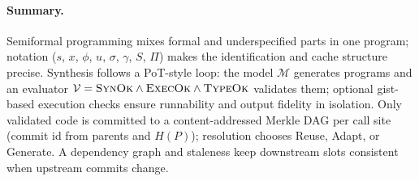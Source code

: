 
\paragraph{Summary.}
Semiformal programming mixes formal and underspecified parts in one program;
notation ($s$, $x$, $\phi$, $u$, $\sigma$, $\gamma$, $S$, $\Pi$) makes the
identification and cache structure precise.  Synthesis follows a PoT-style
loop: the model $\mathcal{M}$ generates programs and an evaluator
$\mathcal{V} = \textsc{SynOk} \wedge \textsc{ExecOk} \wedge \textsc{TypeOk}$
validates them; optional gist-based execution checks ensure runnability and
output fidelity in isolation.  Only validated code is committed to a
content-addressed Merkle DAG per call site (commit id from parents and
$H(P)$); resolution chooses Reuse, Adapt, or Generate.  A dependency graph and
staleness keep downstream slots consistent when upstream commits change.
